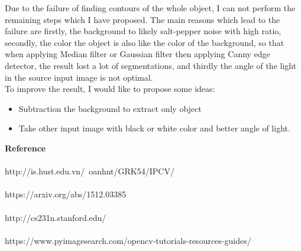 Due to the failure of finding contours of the whole object, I can not perform the remaining steps which I have proposed. The main reasons which lead to the failure are firstly, the background to likely salt-pepper noise with high ratio, secondly, the color the object is also like the color of the background, so that when applying Median filter or Gaussian filter then applying Canny edge detector, the result lost a lot of segmentations, and thirdly the angle of the light in the source input image is not optimal.\\
To improve the result, I would like to propose some ideas:
\begin{itemize}
\item Subtraction the background to extract only object
\item Take other input image with black or white color and better angle of light.
\end{itemize}
\pagebreak
\textbf{\large Reference}\\ \\
\big[1\big] http://is.hust.edu.vn/~oanhnt/GRK54/IPCV/\\ \\
\big[2\big] https://arxiv.org/abs/1512.03385\\ \\
\big[3\big] http://cs231n.stanford.edu/\\ \\
\big[4\big] https://www.pyimagesearch.com/opencv-tutorials-resources-guides/\\ \\


